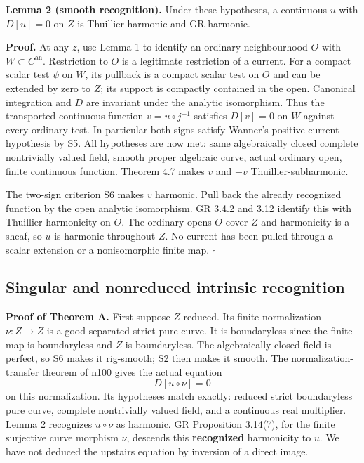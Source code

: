 \documentclass[
  11pt,
]{article}
\begin{document}
\textbf{Lemma 2 (smooth recognition).} Under these hypotheses, a
continuous \(u\) with \(D[u]=0\) on \(Z\) is Thuillier harmonic and
GR-harmonic.

\textbf{Proof.} At any \(z\), use Lemma 1 to identify an ordinary
neighbourhood \(O\) with \(W\subset C^{\mathrm{an}}\). Restriction to
\(O\) is a legitimate restriction of a current. For a compact scalar
test \(\psi\) on \(W\), its pullback is a compact scalar test on \(O\)
and can be extended by zero to \(Z\); its support is compactly contained
in the open. Canonical integration and \(D\) are invariant under the
analytic isomorphism. Thus the transported continuous function
\(v=u\circ j^{-1}\) satisfies \(D[v]=0\) on \(W\) against every ordinary
test. In particular both signs satisfy Wanner's positive-current
hypothesis by S5. All hypotheses are now met: same algebraically closed
complete nontrivially valued field, smooth proper algebraic curve,
actual ordinary open, finite continuous function. Theorem 4.7 makes
\(v\) and \(-v\) Thuillier-subharmonic.

The two-sign criterion S6 makes \(v\) harmonic. Pull back the already
recognized function by the open analytic isomorphism. GR 3.4.2 and 3.12
identify this with Thuillier harmonicity on \(O\). The ordinary opens
\(O\) cover \(Z\) and harmonicity is a sheaf, so \(u\) is harmonic
throughout \(Z\). No current has been pulled through a scalar extension
or a nonisomorphic finite map. \(\square\)

\subsection{Singular and nonreduced intrinsic
recognition}\label{singular-and-nonreduced-intrinsic-recognition}

\textbf{Proof of Theorem A.} First suppose \(Z\) reduced. Its finite
normalization \(\nu:\widetilde Z\to Z\) is a good separated strict pure
curve. It is boundaryless since the finite map is boundaryless and \(Z\)
is boundaryless. The algebraically closed field is perfect, so S6 makes
it rig-smooth; S2 then makes it smooth. The normalization-transfer
theorem of n100 gives the actual equation \[
                         D[u\circ\nu]=0
\] on this normalization. Its hypotheses match exactly: reduced strict
boundaryless pure curve, complete nontrivially valued field, and a
continuous real multiplier. Lemma 2 recognizes \(u\circ\nu\) as
harmonic. GR Proposition 3.14(7), for the finite surjective curve
morphism \(\nu\), descends this \textbf{recognized} harmonicity to
\(u\). We have not deduced the upstairs equation by inversion of a
direct image.
\end{document}
